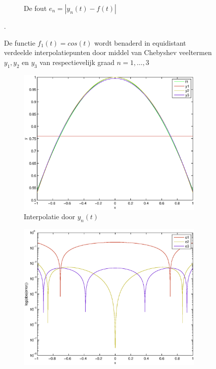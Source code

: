 \documentclass[a4paper]{article}
\begin{document}
\begin{figure}
\begin{subfigure}[t]{0.45\textwidth}
        \caption{De fout $e_{n} = |y_{n}(t)-f(t)|$}
        \label{fig:lin_cos_error}
    \end{subfigure}
    \hfill
    \caption{De functie $f_{1}(t) = cos(t)$ wordt benaderd in equidistant verdeelde interpolatiepunten door middel van Chebyshev veeltermen $y_{1},y_{2}$ en $y_{3}$ van respectievelijk graad $n=1,\dots,3$}
    \label{fig:lin_cos}.
\end{figure}

\begin{figure}
    \centering
    \begin{subfigure}[t]{0.45\textwidth}
        \centering
        \includegraphics[width=\textwidth]{Jona/cheby_cos_interpolation.eps}
        \caption{Interpolatie door $y_{n}(t)$}
    \label{fig:cheb_cos_interpol}
    \end{subfigure}
    \begin{subfigure}[t]{0.45\textwidth}
        \centering
        \includegraphics[width=\textwidth]{Jona/cheby_cos_error.eps}

\end{subfigure}
\end{figure}
\end{document}
